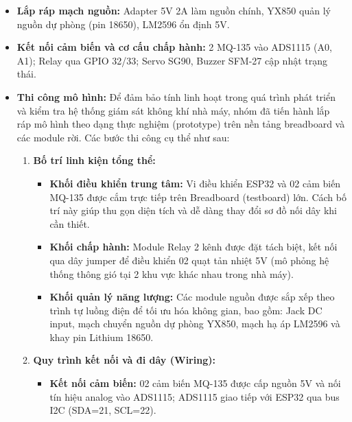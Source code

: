 \documentclass[../BTL_PTIT.tex]{subfiles}
\begin{document}
\begin{itemize}[label=\textbullet]
    \item \textbf{Lắp ráp mạch nguồn:} Adapter 5V 2A làm nguồn chính, YX850 quản lý nguồn dự phòng (pin 18650), LM2596 ổn định 5V.
    
    \item \textbf{Kết nối cảm biến và cơ cấu chấp hành:} 2 MQ-135 vào ADS1115 (A0, A1); Relay qua GPIO 32/33; Servo SG90, Buzzer SFM-27 cập nhật trạng thái.
    
    \item \textbf{Thi công mô hình:} Để đảm bảo tính linh hoạt trong quá trình phát triển và kiểm tra hệ thống giám sát không khí nhà máy, nhóm đã tiến hành lắp ráp mô hình theo dạng thực nghiệm (prototype) trên nền tảng breadboard và các module rời. Các bước thi công cụ thể như sau:
    
    \begin{enumerate}[label=\roman*.]
        \item \textbf{Bố trí linh kiện tổng thể:}
        \begin{itemize}[label=\textperiodcentered]
            \item \textbf{Khối điều khiển trung tâm:} Vi điều khiển ESP32 và 02 cảm biến MQ-135 được cắm trực tiếp trên Breadboard (testboard) lớn. Cách bố trí này giúp thu gọn diện tích và dễ dàng thay đổi sơ đồ nối dây khi cần thiết.
            
            \item \textbf{Khối chấp hành:} Module Relay 2 kênh được đặt tách biệt, kết nối qua dây jumper để điều khiển 02 quạt tản nhiệt 5V (mô phỏng hệ thống thông gió tại 2 khu vực khác nhau trong nhà máy).
            
            \item \textbf{Khối quản lý năng lượng:} Các module nguồn được sắp xếp theo trình tự luồng điện để tối ưu hóa không gian, bao gồm: Jack DC input, mạch chuyển nguồn dự phòng YX850, mạch hạ áp LM2596 và khay pin Lithium 18650.
        \end{itemize}
        
        \item \textbf{Quy trình kết nối và đi dây (Wiring):}
        \begin{itemize}[label=\textperiodcentered]
            \item \textbf{Kết nối cảm biến:} 02 cảm biến MQ-135 được cấp nguồn 5V và nối tín hiệu analog vào ADS1115; ADS1115 giao tiếp với ESP32 qua bus I2C (SDA=21, SCL=22).
            

\end{itemize}
\end{enumerate}
\end{itemize}
\end{document}
